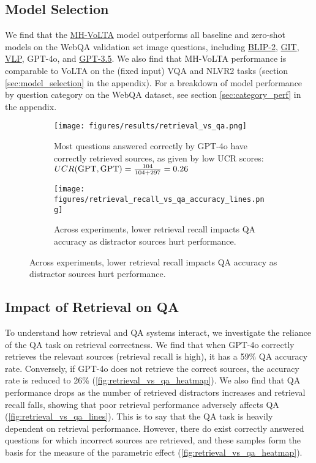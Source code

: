 \subsection{Model Selection}
 We find that the \hyperref[sec:mh-volta]{MH-VoLTA} model outperforms all baseline and zero-shot models on the WebQA validation set image questions, including \hyperref[sec:blip]{BLIP-2}, \hyperref[sec:GIT]{GIT}, \hyperref[sec:VLP]{VLP}, GPT-4o, and \hyperref[sec:gpt3.5]{GPT-3.5}. We also find that MH-VoLTA performance is comparable to VoLTA on the (fixed input) VQA and NLVR2 tasks (section \ref{sec:model_selection} in the appendix). For a breakdown of model performance by question category on the WebQA dataset, see section \ref{sec:category_perf} in the appendix. 


\begin{figure}[!t]
    \centering
    \begin{subfigure}{\linewidth}
        \texttt{[image: figures/results/retrieval\_vs\_qa.png]}
        \caption{Most questions answered correctly by GPT-4o have correctly retrieved sources, as given by low UCR scores: 
        \(UCR(\text{GPT},\text{GPT}) = \frac{104}{104+297} = 0.26\)}
        \label{fig:retrieval_vs_qa_heatmap}
    \end{subfigure}
    
    \begin{subfigure}{\linewidth}
        \texttt{[image: figures/retrieval\_recall\_vs\_qa\_accuracy\_lines.png]}
        \caption{Across experiments, lower retrieval recall impacts QA accuracy as distractor sources hurt performance.}
        \label{fig:retrieval_vs_qa_lines}
    \end{subfigure}
\end{figure}


\subsection{Impact of Retrieval on QA}
To understand how retrieval and QA systems interact, we investigate the reliance of the QA task on retrieval correctness. We find that when GPT-4o correctly retrieves the relevant sources (retrieval recall is high), it has a 59\% QA accuracy rate. Conversely, if GPT-4o does not retrieve the correct sources, the accuracy rate is reduced to 26\% (\autoref{fig:retrieval_vs_qa_heatmap}). We also find that QA performance drops as the number of retrieved distractors increases and retrieval recall falls, showing that poor retrieval performance adversely affects QA (\autoref{fig:retrieval_vs_qa_lines}). This is to say that the QA task is heavily dependent on retrieval performance. However, there do exist correctly answered questions for which incorrect sources are retrieved, and these samples form the basis for the \UCR measure of the parametric effect (\autoref{fig:retrieval_vs_qa_heatmap}).


